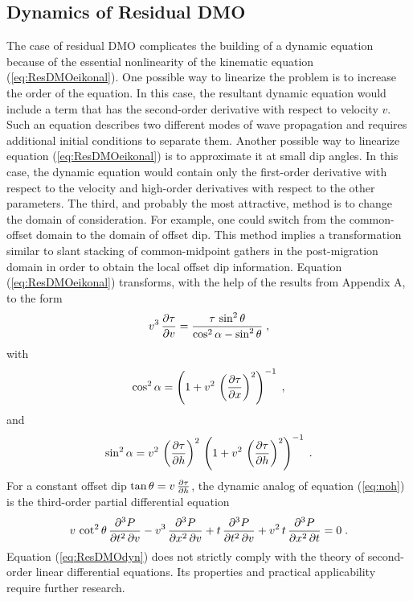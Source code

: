 \subsection{Dynamics of Residual DMO}
The case of residual DMO complicates the building of a dynamic
equation because of the essential nonlinearity of the kinematic
equation (\ref{eq:ResDMOeikonal}). One possible way to linearize the
problem is to increase the order of the equation. In this case, the
resultant dynamic equation would include a term that has the
second-order derivative with respect to velocity $v$. Such an equation
describes two different modes of wave propagation and requires
additional initial conditions to separate them. Another possible way
to linearize equation (\ref{eq:ResDMOeikonal}) is to approximate it at
small dip angles.
In this case, the dynamic
equation would contain only the first-order derivative with respect to
the velocity and high-order derivatives with respect to the other
parameters. The third, and probably the most attractive, method is to
change the domain of consideration. For example, one could switch from
the common-offset domain to the domain of offset dip. This
method implies a transformation similar to slant stacking of
common-midpoint gathers in the post-migration domain in order to
obtain the local offset dip information. Equation (\ref{eq:ResDMOeikonal})
transforms, with the help of the results from Appendix A, to the form
\begin{equation}
v^3\,{{\partial \tau} \over {\partial v}} = 
{{\tau\,\sin^2{\theta}} \over
{\cos^2{\alpha} - \sin^2{\theta}}}\;,
\label{eq:noh} 
\end{equation}
with
\begin{equation}
\cos^2{\alpha} = \left(1 + v^2 \,
\left({{\partial \tau} \over {\partial x}}\right)^2\right)^{-1}\;,
\label{eq:cos2a} 
\end{equation}
and
\begin{equation}
\sin^2{\alpha} = v^2\,
\left({{\partial \tau} \over {\partial h}}\right)^2\,
\left(1 + v^2 \,
\left({{\partial \tau} \over {\partial h}}\right)^2\right)^{-1}\;.
\label{eq:sin2g} 
\end{equation}
For a constant offset dip $\tan{\theta} = v\,{{\partial \tau} \over
{\partial h}}$, the dynamic analog of equation (\ref{eq:noh}) is the
third-order partial differential equation
\begin{equation}
v\,  \cot^2{\theta}\,{{\partial^3 P} \over {\partial t^2\, \partial v}} -
v^3\,{{\partial^3 P} \over {\partial x^2\, \partial v}}
+ t\,{{\partial^3 P} \over {\partial t^2\, \partial v}} +
v^2\,t\,{{\partial^3 P} \over {\partial x^2\, \partial t}} = 0\;.
\label{eq:ResDMOdyn} 
\end{equation}
Equation (\ref{eq:ResDMOdyn}) does not strictly comply with the theory of
second-order linear differential equations. Its properties and
practical applicability require further research.

